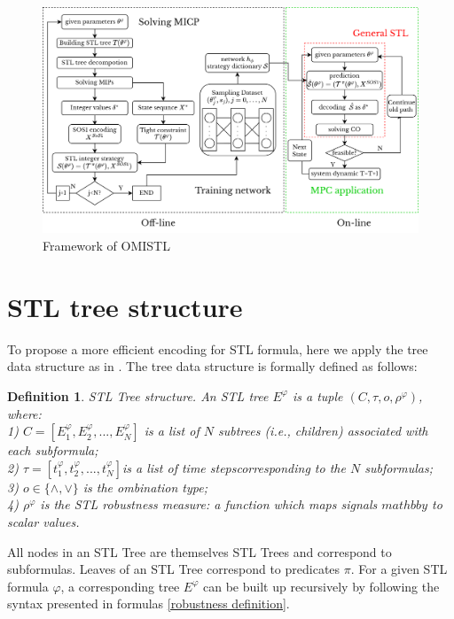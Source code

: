 \documentclass[a4paper]{report}
\newtheorem{myDef}{Definition}
\begin{document}
\begin{figure}
\label{OMISTL}
    \vspace{0.5cm}
    \centering
    \includegraphics[scale=0.65]{omlstl.png}
    \caption{Framework of OMISTL}
\end{figure}

\section{STL tree structure} 
To propose a more efficient encoding for STL formula, here we apply the tree data structure as in \cite{kurtz2022mixed} \cite[]{leung2020back}. The tree data structure is formally defined as follows:
\begin{myDef} STL Tree structure. An STL tree $ E^\varphi$ is a tuple $(C, \tau, o , \rho^\varphi)$, where: \\
    1) $C = [E^\varphi_1,E^\varphi_2,...,E^\varphi_N]  $ is a list of $N$ subtrees (i.e., children) associated with each subformula;\\
    2) $\tau = [t^\varphi_1,t^\varphi_2,...,t^\varphi_N] $is a list of time stepscorresponding to the $N$ subformulas;\\
    3) $o \in \{ \wedge, \vee\}$ is the ombination type;\\
    4) $\rho^\varphi$ is the STL robustness measure: a function which maps signals $mathbb{y}$ to scalar values.
\end{myDef}

All nodes in an STL Tree are themselves STL Trees and correspond to subformulas. Leaves of an STL Tree correspond to predicates $\pi$.
For a given STL formula $\varphi$, a corresponding tree $E^\varphi$ can be built up recursively by following the syntax presented in formulas \ref*{robustness definition}.
\end{document}

